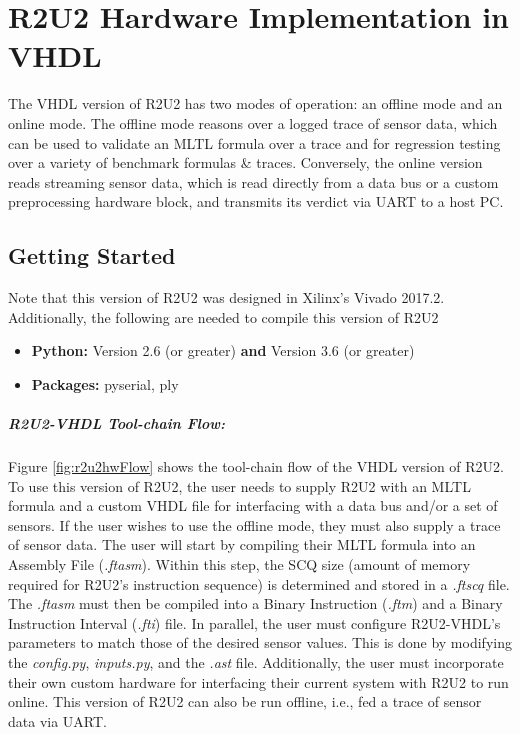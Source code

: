 \section{R2U2 Hardware Implementation in VHDL}
The VHDL version of R2U2 has two modes of operation: an offline mode and an online mode. The offline mode reasons over a logged trace of sensor data, which can be used to validate an MLTL formula over a trace and for regression testing over a variety of benchmark formulas \& traces. Conversely, the online version reads streaming sensor data, which is read directly from a data bus or a custom preprocessing hardware block, and transmits its verdict via UART to a host PC.

\subsection{Getting Started}
Note that this version of R2U2 was designed in Xilinx's Vivado 2017.2. Additionally, the following are needed to compile this version of R2U2
\begin{itemize}
	\item \textbf{Python:} Version 2.6 (or greater) \textbf{and} Version 3.6 (or greater)
	\item \textbf{Packages:} pyserial, ply
\end{itemize}

\subparagraph{R2U2-VHDL Tool-chain Flow:} Figure \ref{fig:r2u2hwFlow} shows the tool-chain flow of the VHDL version of R2U2. To use this version of R2U2, the user needs to supply R2U2 with an MLTL formula and a custom VHDL file for interfacing with a data bus and/or a set of sensors. If the user wishes to use the offline mode, they must also supply a trace of sensor data. The user will start by compiling their MLTL formula into an Assembly File (\textit{.ftasm}). Within this step, the SCQ size (amount of memory required for R2U2's instruction sequence) is determined and stored in a \textit{.ftscq} file. The \textit{.ftasm} must then be compiled into a Binary Instruction (\textit{.ftm}) and a Binary Instruction Interval (\textit{.fti}) file. In parallel, the user must configure R2U2-VHDL's parameters to match those of the desired sensor values. This is done by modifying the \textit{config.py}, \textit{inputs.py}, and the \textit{.ast} file. Additionally, the user must incorporate their own custom hardware for interfacing their current system with R2U2 to run online. This version of R2U2 can also be run offline, i.e., fed a trace of sensor data via UART. 

